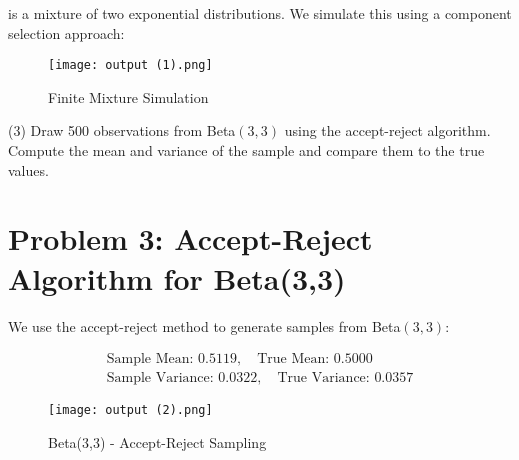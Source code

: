 \documentclass[final,11pt]{article}
\begin{document}
\begin{spacing}{1.25}
is a mixture of two exponential distributions. We simulate this using a component selection approach:

\begin{figure}[H]
    \centering
    \texttt{[image: output (1).png]}
    \caption{Finite Mixture Simulation}
\end{figure}
\newpage

(3) Draw 500 observations from Beta$(3,3)$ using the accept-reject algorithm. Compute the mean and variance of the sample and compare them to the true values.
\section*{Problem 3: Accept-Reject Algorithm for Beta(3,3)}
We use the accept-reject method to generate samples from Beta$(3,3)$:

\begin{gather*}
    \text{Sample Mean: } 0.5119, \quad \text{True Mean: } 0.5000 \\
    \text{Sample Variance: } 0.0322, \quad \text{True Variance: } 0.0357
\end{gather*}

\begin{figure}[H]
    \centering
    \texttt{[image: output (2).png]}
    \caption{Beta(3,3) - Accept-Reject Sampling}
\end{figure}
\end{spacing}
\end{document}
